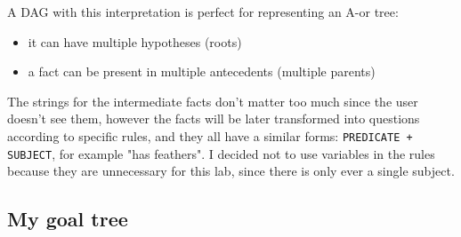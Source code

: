 \documentclass[11pt]{article}
\begin{document}
A DAG with this interpretation is perfect for representing an A-or tree:
\begin{itemize}
\item it can have multiple hypotheses (roots)
\item a fact can be present in multiple antecedents (multiple parents)
\end{itemize}

The strings for the intermediate facts don't matter too much since the user doesn't see them,
however the facts will be later transformed into questions according to specific rules,
and they all have a similar forms: \texttt{PREDICATE + SUBJECT}, for example "has feathers".
I decided not to use variables in the rules because they are unnecessary for this lab,
since there is only ever a single subject.

\subsection{My goal tree}
\label{sec:orgc7c21a2}
\end{document}
